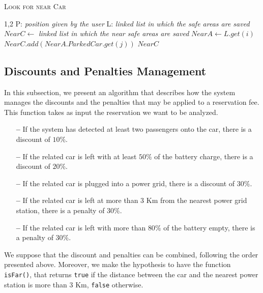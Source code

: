 \vspace{80pt}
\begin{algorithm}[h!tb]
\caption{\textsc{Look for near Car}}
\label{alg:near-car}
\begin{algorithmic}[1]
\begin{spacing}{1,2}
\State P: \textit{position given by the user }
\State L: \textit{linked list in which the safe areas are saved}
\State $NearC \leftarrow $ \textit{linked list in which the near safe areas are saved}
		\State $NearA \leftarrow L.get(i)$
				\State $NearC.add(NearA.ParkedCar.get(j))$
			\EndIf
		\EndFor
	\EndIf
\EndFor
\State\Return $NearC$
\EndFunction
\end{spacing}
\end{algorithmic}
\end{algorithm}

\clearpage

\subsection{Discounts and Penalties Management} \label{subsec:discount}
In this subsection, we present an algorithm that describes how the system manages the discounts and the penalties that may be applied to a reservation fee. 
This function takes as input the reservation we want to be analyzed. 
\begin{enumerate}
\item[\textbf{--}]If the system has detected at least two passengers onto the car, there is a discount of $10\%$.
\item[\textbf{--}]If the related car is left with at least $50\%$ of the battery charge, there is a discount of $20\%$.
\item[\textbf{--}]If the related car is plugged into a power grid, there is a discount of $30\%$.
\item[\textbf{--}]If the related car is left at more than $3$ Km from the nearest power grid station, there is a penalty of $30\%$.
\item[\textbf{--}]If the related car is left with more than $80\%$ of the battery empty, there is a penalty of $30\%$.
\end{enumerate}
We suppose that the discount and penalties can be combined, following the order presented above.
Moreover, we make the hypothesis to have the function \texttt{isFar()}, that returns \texttt{true} if the distance between the car and the nearest power station is more than $3$ Km, \texttt{false} otherwise.
\newline

